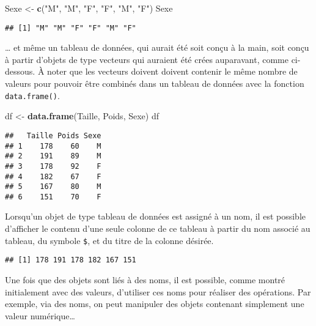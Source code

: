 \documentclass[
  french,
]{book}
\newenvironment{Shaded}{\begin{snugshade}}{\end{snugshade}}
\newcommand{\KeywordTok}[1]{\textcolor[rgb]{0.13,0.29,0.53}{\textbf{#1}}}
\newcommand{\NormalTok}[1]{#1}
\newcommand{\OperatorTok}[1]{\textcolor[rgb]{0.81,0.36,0.00}{\textbf{#1}}}
\newcommand{\StringTok}[1]{\textcolor[rgb]{0.31,0.60,0.02}{#1}}
\begin{document}
\begin{Shaded}
\begin{Highlighting}[]
\NormalTok{Sexe <-}\StringTok{ }\KeywordTok{c}\NormalTok{(}\StringTok{"M"}\NormalTok{, }\StringTok{"M"}\NormalTok{, }\StringTok{"F"}\NormalTok{, }\StringTok{"F"}\NormalTok{, }\StringTok{"M"}\NormalTok{, }\StringTok{"F"}\NormalTok{)}
\NormalTok{Sexe}
\end{Highlighting}
\end{Shaded}

\begin{verbatim}
## [1] "M" "M" "F" "F" "M" "F"
\end{verbatim}

\ldots{} et même un tableau de données, qui aurait été soit conçu à la main, soit conçu à partir d'objets de type vecteurs qui auraient été crées auparavant, comme ci-dessous. À noter que les vecteurs doivent doivent contenir le même nombre de valeurs pour pouvoir être combinés dans un tableau de données avec la fonction \texttt{data.frame()}.

\begin{Shaded}
\begin{Highlighting}[]
\NormalTok{df <-}\StringTok{ }\KeywordTok{data.frame}\NormalTok{(Taille, Poids, Sexe)}
\NormalTok{df}
\end{Highlighting}
\end{Shaded}

\begin{verbatim}
##   Taille Poids Sexe
## 1    178    60    M
## 2    191    89    M
## 3    178    92    F
## 4    182    67    F
## 5    167    80    M
## 6    151    70    F
\end{verbatim}

Lorsqu'un objet de type tableau de données est assigné à un nom, il est possible d'afficher le contenu d'une seule colonne de ce tableau à partir du nom associé au tableau, du symbole \texttt{\$}, et du titre de la colonne désirée.

\begin{Shaded}
\end{Shaded}

\begin{verbatim}
## [1] 178 191 178 182 167 151
\end{verbatim}

Une fois que des objets sont liés à des noms, il est possible, comme montré initialement avec des valeurs, d'utiliser ces noms pour réaliser des opérations. Par exemple, via des noms, on peut manipuler des objets contenant simplement une valeur numérique\ldots{}
\end{document}

